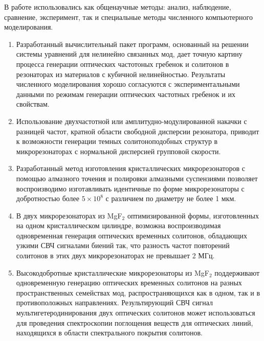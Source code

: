 {\methods} В работе использовались как общенаучные методы: анализ, наблюдение, сравнение, эксперимент, так и специальные методы численного компьютерного моделирования.

{}
\begin{enumerate}
  \item Разработанный вычислительный пакет программ, основанный на решении системы уравнений для нелинейно связанных мод, дает точную картину процесса генерации оптических частотоных гребенок и солитонов в резонаторах из материалов с кубичной нелинейностью. Результаты численного моделирования хорошо согласуются с экспериментальными данными по режимам генерации оптических частотных гребенок и их свойствам.
  \item Использование двухчастотной или амплитудно-модулированной накачки с разницей частот, кратной области свободной дисперсии резонатора, приводит к возможности генерации темных солитоноподобных структур в микрорезонаторах с нормальной дисперсией групповой скорости.
  \item Разработанный метод изготовления кристаллических микрорезонаторов с помощью алмазного точения и полировки алмазными суспензиями позволяет воспроизводимо изготавливать идентичные по форме микрорезонаторы с добротностью более $5\times10^8$ с различием по диаметру не более 1 мкм.
  \item В двух микрорезонаторах из MgF$_2$ оптимизированной формы, изготовленных на одном кристаллическом цилиндре, возможна воспроизводимая одновременная генерация оптических временных солитонов, обладающих узкими СВЧ сигналами биений так, что разность частот повторений солитонов в этих двух микрорезонаторах не превышает 2 МГц.
  \item Высокодобротные кристаллические микрорезонаторы из MgF$_2$ поддерживают одновременную генерацию оптических временных солитонов на разных пространственных семействах мод, распространяющихся как в одном, так и в противоположных направлениях. Результирующий СВЧ сигнал мультигетеродинирования двух оптических солитонов может использоваться для проведения спектроскопии поглощения веществ для оптических линий, находящихся в области спектрального покрытия солитонов.
\end{enumerate}


